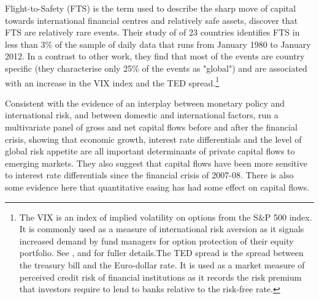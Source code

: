 \documentclass[12pt, a4paper, oneside]{article} %
\begin{document}
Flight-to-Safety (FTS) is the term used to describe the sharp move of capital towards international financial centres and relatively safe assets,\citet{FTS} discover that FTS are relatively rare events. Their study of of 23 countries identifies FTS in less than 3\% of the sample of daily data that runs from January 1980 to January 2012.  In a contrast to other work, they find that most of the events are country specific (they characterise only 25\% of the events as "global") and are associated with an increase in the VIX index and the TED spread.\footnote{The VIX is an index of implied volatility on options from the S\&P 500 index.  It is commonly used as a measure of international risk aversion as it signals increased demand by fund managers for option protection of their equity portfolio.  See \citet{VIX}, \citet{GoldmanVol} and \citet{Diamond} for fuller details.The TED spread is the spread between the treasury bill and the Euro-dollar rate.  It is used as a market measure of perceived credit risk of financial institutions as it records the risk premium that investors require to lend to banks relative to the risk-free rate.}   %


Consistent with the evidence of an interplay between monetary policy and international risk, and between domestic and international factors, \citet{Ahmed2014} run a multivariate panel of gross and net capital flows before and after the financial crisis, showing that economic growth, interest rate differentials and the level of global risk appetite are all important determinants of private capital flows to emerging markets.  They also suggest that capital flows have been more sensitive to interest rate differentials since the financial crisis of 2007-08. There is also some evidence here that quantitative easing has had some effect on capital flows. 
\end{document}
